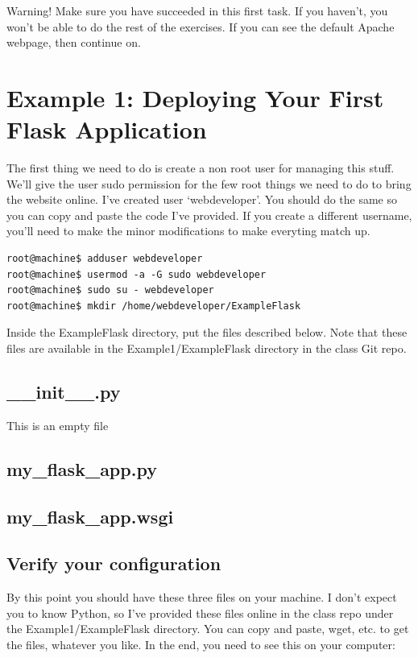 \documentclass[10pt]{article}
\begin{document}
{\Large \color{red} Warning! Make sure you have succeeded in this first task. If
you haven't, you won't be able to do the rest of the exercises. If you can see
the default Apache webpage, then continue on. }

\section{Example 1: Deploying Your First Flask Application}
The first thing we need to do is create a non root user for managing this stuff. We'll give the user sudo permission for the few root things we need to do to bring the website online. I've created user `webdeveloper'. You should do the same so you can copy and paste the code I've provided. If you create a different username, you'll need to make the minor modifications to make everyting match up.

\begin{lstlisting}[style=term]
root@machine$ adduser webdeveloper
root@machine$ usermod -a -G sudo webdeveloper
root@machine$ sudo su - webdeveloper
root@machine$ mkdir /home/webdeveloper/ExampleFlask
\end{lstlisting}

Inside the ExampleFlask directory, put the files described below. Note that these files are available in the Example1/ExampleFlask directory in the class Git repo.

\subsection{\_\_init\_\_.py}
This is an empty file

\subsection{my\_flask\_app.py}


\subsection{my\_flask\_app.wsgi}


\subsection{Verify your configuration}
By this point you should have these three files on your machine. I don't expect
you to know Python, so I've provided these files online in the class repo under
the Example1/ExampleFlask directory. You can copy and paste, wget, etc. to get
the files, whatever you like. In the end, you need to see this on your computer:
\end{document}
